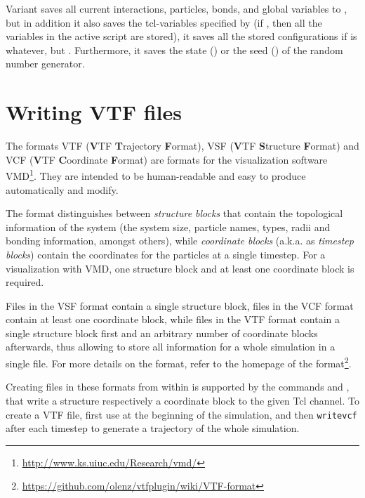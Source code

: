 Variant  saves all current interactions, particles, bonds,
and global variables to , but in addition it also
saves the tcl-variables specified by  (if , then
all the variables in the active script are stored), it saves all the
stored configurations if  is whatever, but \lit{-}.
Furthermore, it saves the state () or the seed ()
of the random number generator.

\section{Writing VTF files}
\label{sec:vtf}

The formats VTF (\textbf{V}TF \textbf{T}rajectory \textbf{F}ormat),
VSF (\textbf{V}TF \textbf{S}tructure \textbf{F}ormat) and VCF
(\textbf{V}TF \textbf{C}oordinate \textbf{F}ormat) are formats for the
visualization software
VMD\cite{humphrey96a}\footnote{\url{http://www.ks.uiuc.edu/Research/vmd/}}. They
are intended to be human-readable and easy to produce automatically
and modify.

The format distinguishes between \emph{structure blocks} that contain
the topological information of the system (\ie the system size,
particle names, types, radii and bonding information, amongst others),
while \emph{coordinate blocks} (a.k.a. as \emph{timestep blocks})
contain the coordinates for the particles at a single timestep.  For a
visualization with VMD, one structure block and at least one
coordinate block is required.

Files in the VSF format contain a single structure block, files in the
VCF format contain at least one coordinate block, while files in the
VTF format contain a single structure block first and an arbitrary
number of coordinate blocks afterwards, thus allowing to store all
information for a whole simulation in a single file. For more details
on the format, refer to the homepage of the
format\footnote{\url{https://github.com/olenz/vtfplugin/wiki/VTF-format}}.

Creating files in these formats from within \es is supported by the
commands  and , that write a structure
respectively a coordinate block to the given Tcl channel. To create a
VTF file, first use  at the beginning of the simulation,
and then \texttt{writevcf} after each timestep to generate a
trajectory of the whole simulation.

